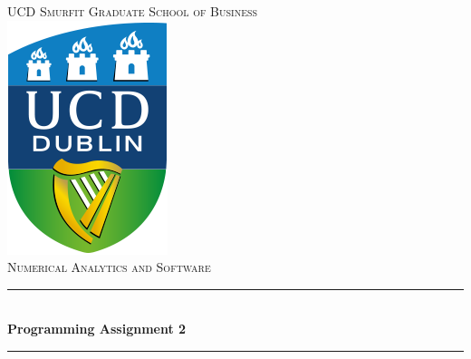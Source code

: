 \documentclass[paper=a4, fontsize=10pt]{scrartcl} %
\begin{document}
\begin{titlepage}

\newcommand{\HRule}{\rule{\linewidth}{0.5mm}} %

\center %
 

\textsc{\LARGE UCD Smurfit Graduate School of Business}\\[1.5cm] %
\includegraphics[scale = 0.6]{images/logo.png} \\ [1cm]
\textsc{\Large Numerical Analytics and Software}\\[0.5cm] %


\HRule \\[0.4cm]
{ \LARGE \bfseries Programming Assignment 2}\\[0.4cm] %
\HRule \\[1.5cm]
 


\end{titlepage}
\end{document}
